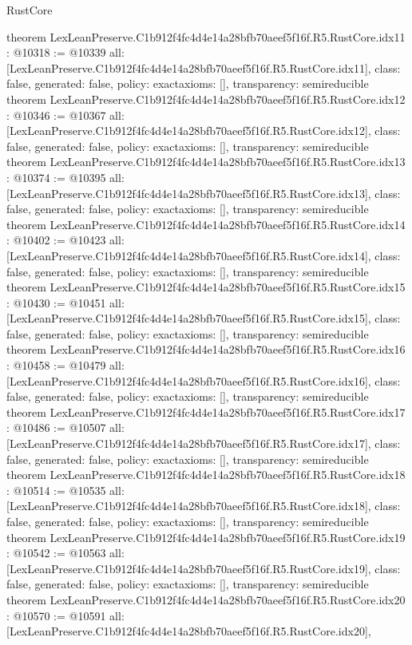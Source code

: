 \begin{lexlean}{RustCore}
\begin{coremodule}
{}
theorem LexLeanPreserve.C1b912f4fc4d4e14a28bfb70aeef5f16f.R5.RustCore.idx11 : @10318 := @10339 {
  all: [LexLeanPreserve.C1b912f4fc4d4e14a28bfb70aeef5f16f.R5.RustCore.idx11],
  class: false,
  generated: false,
  policy: exact{axioms: []},
  transparency: semireducible
}
theorem LexLeanPreserve.C1b912f4fc4d4e14a28bfb70aeef5f16f.R5.RustCore.idx12 : @10346 := @10367 {
  all: [LexLeanPreserve.C1b912f4fc4d4e14a28bfb70aeef5f16f.R5.RustCore.idx12],
  class: false,
  generated: false,
  policy: exact{axioms: []},
  transparency: semireducible
}
theorem LexLeanPreserve.C1b912f4fc4d4e14a28bfb70aeef5f16f.R5.RustCore.idx13 : @10374 := @10395 {
  all: [LexLeanPreserve.C1b912f4fc4d4e14a28bfb70aeef5f16f.R5.RustCore.idx13],
  class: false,
  generated: false,
  policy: exact{axioms: []},
  transparency: semireducible
}
theorem LexLeanPreserve.C1b912f4fc4d4e14a28bfb70aeef5f16f.R5.RustCore.idx14 : @10402 := @10423 {
  all: [LexLeanPreserve.C1b912f4fc4d4e14a28bfb70aeef5f16f.R5.RustCore.idx14],
  class: false,
  generated: false,
  policy: exact{axioms: []},
  transparency: semireducible
}
theorem LexLeanPreserve.C1b912f4fc4d4e14a28bfb70aeef5f16f.R5.RustCore.idx15 : @10430 := @10451 {
  all: [LexLeanPreserve.C1b912f4fc4d4e14a28bfb70aeef5f16f.R5.RustCore.idx15],
  class: false,
  generated: false,
  policy: exact{axioms: []},
  transparency: semireducible
}
theorem LexLeanPreserve.C1b912f4fc4d4e14a28bfb70aeef5f16f.R5.RustCore.idx16 : @10458 := @10479 {
  all: [LexLeanPreserve.C1b912f4fc4d4e14a28bfb70aeef5f16f.R5.RustCore.idx16],
  class: false,
  generated: false,
  policy: exact{axioms: []},
  transparency: semireducible
}
theorem LexLeanPreserve.C1b912f4fc4d4e14a28bfb70aeef5f16f.R5.RustCore.idx17 : @10486 := @10507 {
  all: [LexLeanPreserve.C1b912f4fc4d4e14a28bfb70aeef5f16f.R5.RustCore.idx17],
  class: false,
  generated: false,
  policy: exact{axioms: []},
  transparency: semireducible
}
theorem LexLeanPreserve.C1b912f4fc4d4e14a28bfb70aeef5f16f.R5.RustCore.idx18 : @10514 := @10535 {
  all: [LexLeanPreserve.C1b912f4fc4d4e14a28bfb70aeef5f16f.R5.RustCore.idx18],
  class: false,
  generated: false,
  policy: exact{axioms: []},
  transparency: semireducible
}
theorem LexLeanPreserve.C1b912f4fc4d4e14a28bfb70aeef5f16f.R5.RustCore.idx19 : @10542 := @10563 {
  all: [LexLeanPreserve.C1b912f4fc4d4e14a28bfb70aeef5f16f.R5.RustCore.idx19],
  class: false,
  generated: false,
  policy: exact{axioms: []},
  transparency: semireducible
}
theorem LexLeanPreserve.C1b912f4fc4d4e14a28bfb70aeef5f16f.R5.RustCore.idx20 : @10570 := @10591 {
  all: [LexLeanPreserve.C1b912f4fc4d4e14a28bfb70aeef5f16f.R5.RustCore.idx20],
}
\end{coremodule}
\end{lexlean}
